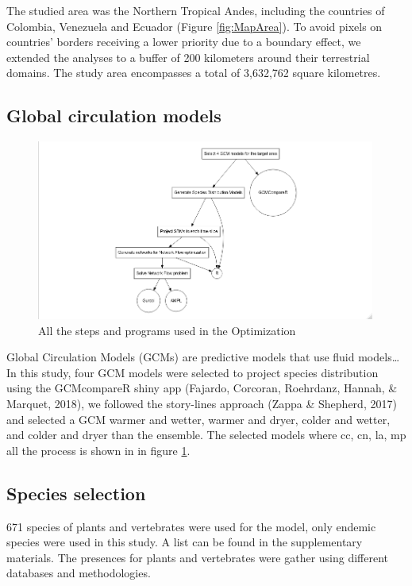 \documentclass[]{article}
\begin{document}
The studied area was the Northern Tropical Andes, including the countries of Colombia, Venezuela and Ecuador (Figure \ref{fig:MapArea}). To avoid pixels on countries' borders receiving a lower priority due to a boundary effect, we extended the analyses to a buffer of 200 kilometers around their terrestrial domains. The study area encompasses a total of 3,632,762 square kilometres.

\hypertarget{global-circulation-models}{%
\subsection{Global circulation models}\label{global-circulation-models}}

\begin{figure}
\includegraphics[width=4.39in]{Diag1} \caption{All the steps and programs used in the Optimization}\label{fig:Diagrama}
\end{figure}

Global Circulation Models (GCMs) are predictive models that use fluid models\ldots{}
In this study, four GCM models were selected to project species distribution using the GCMcompareR shiny app (Fajardo, Corcoran, Roehrdanz, Hannah, \& Marquet, 2018), we followed the story-lines approach (Zappa \& Shepherd, 2017) and selected a GCM warmer and wetter, warmer and dryer, colder and wetter, and colder and dryer than the ensemble. The selected models where cc, cn, la, mp all the process is shown in in figure \ref{fig:Diagrama}.

\hypertarget{species-selection}{%
\subsection{Species selection}\label{species-selection}}

671 species of plants and vertebrates were used for the model, only endemic species were used in this study. A list can be found in the supplementary materials. The presences for plants and vertebrates were gather using different databases and methodologies.
\end{document}
